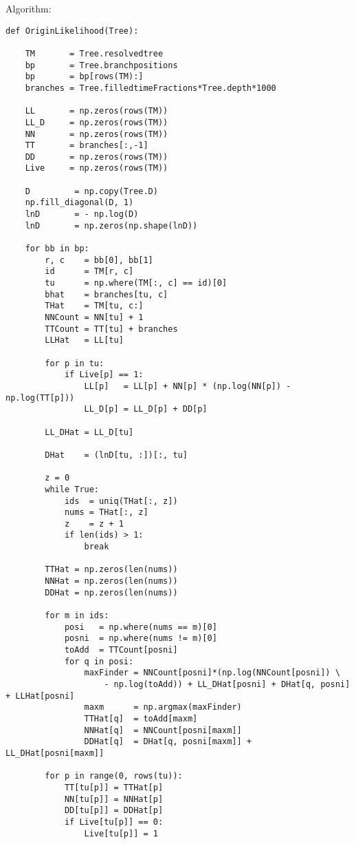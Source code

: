 \documentclass[11pt]{article}
\begin{document}
Algorithm:
\begin{tiny}
\begin{verbatim}
def OriginLikelihood(Tree):

    TM       = Tree.resolvedtree
    bp       = Tree.branchpositions
    bp       = bp[rows(TM):]
    branches = Tree.filledtimeFractions*Tree.depth*1000

    LL       = np.zeros(rows(TM))
    LL_D     = np.zeros(rows(TM))
    NN       = np.zeros(rows(TM))
    TT       = branches[:,-1]
    DD       = np.zeros(rows(TM))
    Live     = np.zeros(rows(TM))

    D         = np.copy(Tree.D)
    np.fill_diagonal(D, 1)
    lnD       = - np.log(D)
    lnD       = np.zeros(np.shape(lnD))

    for bb in bp:
        r, c    = bb[0], bb[1]
        id      = TM[r, c]
        tu      = np.where(TM[:, c] == id)[0]
        bhat    = branches[tu, c]
        THat    = TM[tu, c:]
        NNCount = NN[tu] + 1
        TTCount = TT[tu] + branches
        LLHat   = LL[tu]

        for p in tu:
            if Live[p] == 1:
                LL[p]   = LL[p] + NN[p] * (np.log(NN[p]) - np.log(TT[p]))
                LL_D[p] = LL_D[p] + DD[p]

        LL_DHat = LL_D[tu]

        DHat    = (lnD[tu, :])[:, tu]

        z = 0
        while True:
            ids  = uniq(THat[:, z])
            nums = THat[:, z]
            z    = z + 1
            if len(ids) > 1:
                break

        TTHat = np.zeros(len(nums))
        NNHat = np.zeros(len(nums))
        DDHat = np.zeros(len(nums))

        for m in ids:
            posi   = np.where(nums == m)[0]
            posni  = np.where(nums != m)[0]
            toAdd  = TTCount[posni]
            for q in posi:
                maxFinder = NNCount[posni]*(np.log(NNCount[posni]) \
                    - np.log(toAdd)) + LL_DHat[posni] + DHat[q, posni] + LLHat[posni]
                maxm      = np.argmax(maxFinder)
                TTHat[q]  = toAdd[maxm]
                NNHat[q]  = NNCount[posni[maxm]]
                DDHat[q]  = DHat[q, posni[maxm]] + LL_DHat[posni[maxm]]

        for p in range(0, rows(tu)):
            TT[tu[p]] = TTHat[p]
            NN[tu[p]] = NNHat[p]
            DD[tu[p]] = DDHat[p]
            if Live[tu[p]] == 0:
                Live[tu[p]] = 1


\end{verbatim}
\end{tiny}
\end{document}
